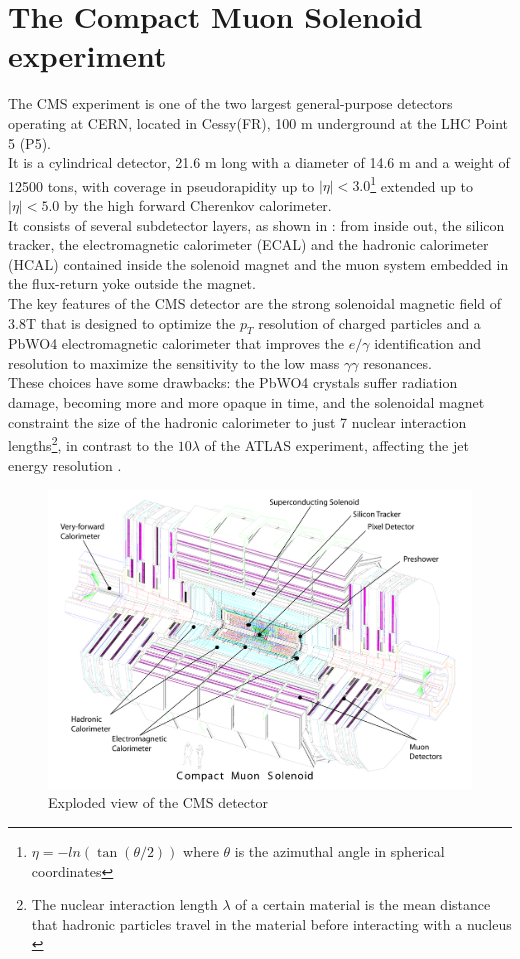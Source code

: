 \section{The Compact Muon Solenoid experiment}
The CMS experiment \cite{Chatrchyan2008TheLHC} is one of the two largest general-purpose detectors operating at CERN, located in Cessy(FR), 100 m underground at the LHC Point 5 (P5).\\
It is a cylindrical detector, 21.6 m long with a diameter of 14.6 m and a weight of 12500 tons, with coverage in pseudorapidity up to $|\eta|<3.0$\footnote{$\eta=-ln(\tan (\theta/2))$ where $\theta$ is the azimuthal angle in spherical coordinates} extended up to $|\eta|<5.0$ by the high forward Cherenkov calorimeter.\\
It consists of several subdetector layers, as shown in : from inside out, the silicon tracker, the electromagnetic calorimeter (ECAL) and the hadronic calorimeter (HCAL) contained inside the solenoid magnet and the muon system embedded in the flux-return yoke outside the magnet.\\
The key features of the CMS detector are the strong solenoidal magnetic field of 3.8T that is designed to optimize the $p_T$ resolution of charged particles and a PbWO4 electromagnetic calorimeter that improves the $e/\gamma$ identification and resolution to maximize the sensitivity to the low mass $\gamma \gamma$ resonances.\\
These choices have some drawbacks: the PbWO4 crystals suffer radiation damage, becoming more and more opaque in time, and the solenoidal magnet constraint the size of the hadronic calorimeter to just 7 nuclear interaction lengths\footnote{The nuclear interaction length $\lambda$ of a certain material is the mean distance that hadronic particles travel in the material before interacting with a nucleus \label{fn:ncl}}, in contrast to the $10\lambda$ of the ATLAS experiment, affecting the jet energy resolution \cite{Spiropulu2012LHCsDETECTORS}.
\begin{figure}[h!]
    \centering
    \includegraphics[width=1\linewidth]{fig//chap03-cms/CMS_detector_white.pdf}
    \caption{Exploded view of the CMS detector \cite{Chatrchyan2008TheLHC}}
    \label{fig:cms_exploded}
\end{figure}

